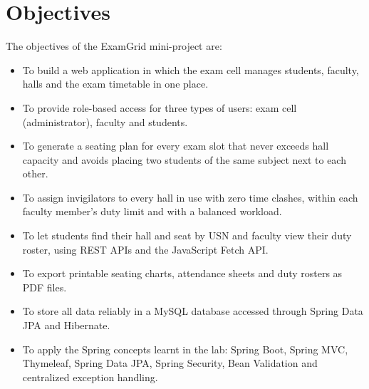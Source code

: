 \documentclass[12pt,letterpaper]{article}
\renewcommand{\thesection}{\arabic{section}}
\newcommand{\chapter}[1]{\clearpage\refstepcounter{section}\section*{#1}\label{ch:\thesection}}
\begin{document}
\chapter{Objectives}
The objectives of the ExamGrid mini-project are:
\begin{itemize}
  \item To build a web application in which the exam cell manages students, faculty, halls and the exam timetable in one place.
  \item To provide role-based access for three types of users: exam cell (administrator), faculty and students.
  \item To generate a seating plan for every exam slot that never exceeds hall capacity and avoids placing two students of the same subject next to each other.
  \item To assign invigilators to every hall in use with zero time clashes, within each faculty member's duty limit and with a balanced workload.
  \item To let students find their hall and seat by USN and faculty view their duty roster, using REST APIs and the JavaScript Fetch API.
  \item To export printable seating charts, attendance sheets and duty rosters as PDF files.
  \item To store all data reliably in a MySQL database accessed through Spring Data JPA and Hibernate.
  \item To apply the Spring concepts learnt in the lab: Spring Boot, Spring MVC, Thymeleaf, Spring Data JPA, Spring Security, Bean Validation and centralized exception handling.
\end{itemize}
\end{document}
